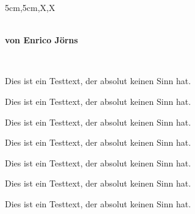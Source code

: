 \documentclass[a3paper,scifiposter,style=scifi]{tubsposter}
\begin{document}
  \begin{tubsposter}{5cm,5cm,X,X}
  \begin{posterrow}
    \bfseries{}\\[1em]
    von Enrico Jörns
  \end{posterrow}
  \begin{posterrow}[X,3cm,X,bgcolor=tuBlue]
    \begin{modcol*}[bgimage=infozentrum]
      ~
    \end{modcol*}
    \begin{postercol}[bgimage=infozentrum,imagefit=scaled]
      Dies ist ein Testtext, der absolut keinen Sinn hat.
    \end{postercol}
    \begin{postercol}
      Dies ist ein Testtext, der absolut keinen Sinn hat.
    \end{postercol}
  \end{posterrow}
  \begin{posterrow}[X,X,X,bgcolor=tuViolet]
    \begin{postercol}[X,X,bgcolor=tuRed]
      \begin{postersubrow}
        Dies ist ein Testtext, der absolut keinen Sinn hat.
      \end{postersubrow}
      \begin{postersubrow}
        Dies ist ein Testtext, der absolut keinen Sinn hat.
      \end{postersubrow}
    \end{postercol}
    \begin{postercol}
      Dies ist ein Testtext, der absolut keinen Sinn hat.
    \end{postercol}
    \begin{postercol}[X,X]
      \begin{postersubrow}
        Dies ist ein Testtext, der absolut keinen Sinn hat.
      \end{postersubrow}
      \begin{postersubrow}[bgcolor=tuOrange]
        Dies ist ein Testtext, der absolut keinen Sinn hat.
      \end{postersubrow}
    \end{postercol}
  \end{posterrow}
  \begin{modrow*}[bgimage=infozentrum]
    ~
  \end{modrow*}
\end{tubsposter}
\end{document}
